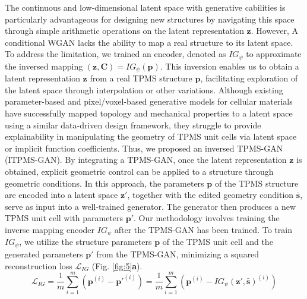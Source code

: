 \documentclass[preprint,review,12pt,authoryear]{elsarticle}
\begin{document}
The continuous and low-dimensional latent space with generative cabilities is particularly advantageous for designing new structures by navigating this space through simple arithmetic operations on the latent representation $\boldsymbol{z}$. However, A conditional WGAN lacks the ability to map a real structure to its latent space. To address the limitation, we trained an encoder, denoted as $IG_\psi$ to approximate the inversed mapping $(\boldsymbol{z},\boldsymbol{C})=IG_\psi(\boldsymbol{p})$. This inversion enables us to obtain a latent representation $\boldsymbol{z}$ from a real TPMS structure $\boldsymbol{p}$, facilitating exploration of the latent space through interpolation or other variations. Although existing parameter-based and pixel/voxel-based generative models for cellular materials have successfully mapped topology and mechanical properties to a latent space using a similar data-driven design framework, they struggle to provide explainability in manipulating the geometry of TPMS unit cells via latent space or implicit function coefficients. Thus, we proposed an inversed TPMS-GAN (ITPMS-GAN). By integrating a TPMS-GAN, once the latent representation $\boldsymbol{z}$ is obtained, explicit geometric control can be applied to a structure through geometric conditions. In this approach, the parameters $\boldsymbol{p}$ of the TPMS structure are encoded into a latent space $\boldsymbol{z}'$, together with the edited geometry condition $\bar{\boldsymbol{s}}$, serve as input into a well-trained generator. The generator then produces a new TPMS unit cell with parameters $\boldsymbol{p}'$. Our methodology involves training the inverse mapping encoder $IG_\psi$ after the TPMS-GAN has been trained. To train $IG_\psi$, we utilize the structure parameters $\boldsymbol{p}$ of the TPMS unit cell and the generated parameters $\boldsymbol{p}'$ from the TPMS-GAN, minimizing a squared reconstruction loss $\mathcal{L}_{IG}$ (Fig. \ref{fig:5}\textbf{a}).
\begin{equation}
    \mathcal{L}_{IG} = \frac{1}{m}\sum_{i=1}^m(\boldsymbol{p}^{(i)}-\boldsymbol{p}'^{(i)})= \frac{1}{m}\sum_{i=1}^m(\boldsymbol{p}^{(i)}-IG_\psi(\boldsymbol{z}',\bar{\boldsymbol{s}})^{(i)})
\label{eq:21}
\end{equation}
\end{document}
